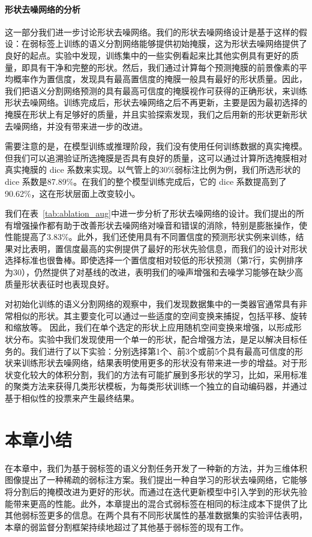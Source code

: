 \paragraph{形状去噪网络的分析}
这一部分我们进一步讨论形状去噪网络。我们的形状去噪网络设计是基于这样的假设：在弱标签上训练的语义分割网络能够提供初始掩膜，这为形状去噪网络提供了良好的起点。实验中发现，训练集中的一些实例看起来比其他实例具有更好的质量，即具有干净和完整的形状。然后，我们通过计算每个预测掩膜的前景像素的平均概率作为置信度，发现具有最高置信度的掩膜一般具有最好的形状质量。因此，我们把语义分割网络预测的具有最高可信度的掩膜视作可获得的正确形状，来训练形状去噪网络。训练完成后，形状去噪网络之后不再更新，主要是因为最初选择的掩膜在形状上有足够好的质量，并且实验探索发现，我们之后用新的形状更新形状去噪网络，并没有带来进一步的改进。

需要注意的是，在模型训练或推理阶段，我们没有使用任何训练数据的真实掩模。但我们可以追溯验证所选掩膜是否具有良好的质量，这可以通过计算所选掩膜相对真实掩膜的 dice 系数来实现。以气管上的30\%弱标注比例为例，我们所选形状的 dice 系数是87.89\%。在我们的整个模型训练完成后，它的 dice 系数提高到了 90.62\%，这在形状层面上改变较小。

我们在表~\ref{tab:ablation_aug}中进一步分析了形状去噪网络的设计。我们提出的所有增强操作都有助于改善形状去噪网络对噪音和错误的消除，特别是膨胀操作，使性能提高了3.83\%。此外，我们还使用具有不同置信度的预测形状实例来训练，结果对比表明，置信度最高的实例提供了最好的形状先验信息，而我们的设计对形状选择标准也很鲁棒。即使选择一个置信度相对较低的形状预测（第7行，实例排序为30），仍然提供了对基线的改进，表明我们的噪声增强和去噪学习能够在缺少高质量形状表征时也表现良好。

对初始化训练的语义分割网络的观察中，我们发现数据集中的一类器官通常具有非常相似的形状。其主要变化可以通过一些适度的空间变换来捕捉，包括平移、旋转和缩放等。
因此，我们在单个选定的形状上应用随机空间变换来增强，以形成形状分布。实验中我们发现使用一个单一的形状，配合增强方法，是足以解决目标任务的。我们进行了以下实验：分别选择第1个、前3个或前5个具有最高可信度的形状来训练形状去噪网络，结果表明使用更多的形状没有带来进一步的增益。对于形状变化较大的体积分割，我们的方法有可能扩展到多形状的学习，比如，采用标准的聚类方法来获得几类形状模板，为每类形状训练一个独立的自动编码器，并通过基于相似性的投票来产生最终结果。





\section{本章小结}
在本章中，我们为基于弱标签的语义分割任务开发了一种新的方法，并为三维体积图像提出了一种稀疏的弱标注方案。我们提出一种自学习的形状去噪网络，它能够将分割后的掩模改进为更好的形状。而通过在迭代更新模型中引入学到的形状先验能带来更高的性能。此外，本章提出的混合式弱标签在相同的标注成本下提供了比其他弱标签更多的信息。在两个具有不同形状属性的基准数据集的实验评估表明，本章的弱监督分割框架持续地超过了其他基于弱标签的现有工作。